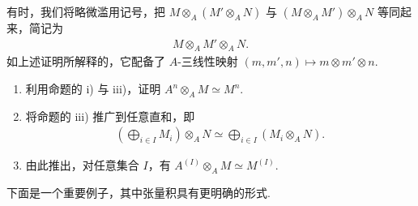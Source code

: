 \begin{remark*}
有时，我们将略微滥用记号，把 $M\otimes_A(M'\otimes_A N)$ 与 $(M\otimes_A M')\otimes_A N$ 等同起来，简记为
\begin{align*}
M\otimes_A M'\otimes_A N.
\end{align*}
如上述证明所解释的，它配备了 $A$-三线性映射 $(m,m',n)\mapsto m\otimes m'\otimes n$.
\end{remark*}
\begin{exercise*}
\begin{enumerate}[label=\roman*)]
\item 利用命题的 i) 与 iii)，证明 $A^n\otimes_A M\simeq M^n$.
\item 将命题的 iii) 推广到任意直和，即
\begin{align*}
\left(\bigoplus_{i\in I}M_i\right)\otimes_A N\simeq\bigoplus_{i\in I}(M_i\otimes_A N).
\end{align*}
\item 由此推出，对任意集合 $I$，有 $A^{(I)}\otimes_A M\simeq M^{(I)}$.
\end{enumerate}
\end{exercise*}
下面是一个重要例子，其中张量积具有更明确的形式.

